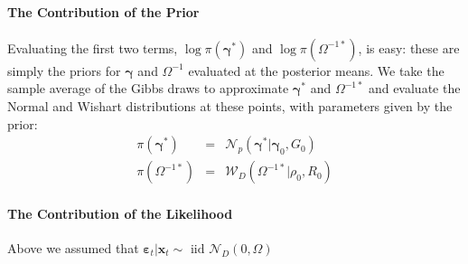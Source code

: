 \documentclass[12pt]{article}
\begin{document}
\paragraph{The Contribution of the Prior}
Evaluating the first two terms, $\log \pi(\boldsymbol{\gamma}^*)$ and $\log \pi\left( \Omega^{-1*} \right)$, is easy: these are simply the priors for $\boldsymbol{\gamma}$ and $\Omega^{-1}$ evaluated at the posterior means.
We take the sample average of the Gibbs draws to approximate $\boldsymbol{\gamma}^*$ and $\Omega^{-1*}$ and evaluate the Normal and Wishart distributions at these points, with parameters given by the prior:
\begin{eqnarray*}
  \pi\left( \boldsymbol{\gamma}^* \right) &=& \mathcal{N}_p\left( \boldsymbol{\gamma}^* | \boldsymbol{\gamma}_0, G_0 \right)\\
  \pi\left( \Omega^{-1*} \right) &=& \mathcal{W}_D\left( \Omega^{-1*}|\rho_0, R_0 \right)
\end{eqnarray*}

\paragraph{The Contribution of the Likelihood}
Above we assumed that $\boldsymbol{\varepsilon}_t|\mathbf{x}_t \sim \mbox{ iid } \mathcal{N}_D(0,\Omega)$
\end{document}
